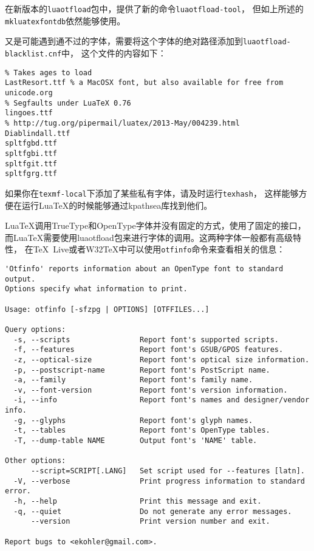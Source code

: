 \documentclass[DIV=13]{article}
\def\LuaTeX{Lua\TeX}
\def\XeTeX{\hologo{XeTeX}}
\begin{document}
在新版本的\texttt{luaotfload}包中，提供了新的命令\texttt{luaotfload-tool}，
但如上所述的\texttt{mkluatexfontdb}依然能够使用。

又是可能遇到通不过的字体，需要将这个字体的绝对路径添加到\texttt{luaotfload-blacklist.cnf}中，
这个文件的内容如下：
\begin{verbatim}
% Takes ages to load
LastResort.ttf % a MacOSX font, but also available for free from unicode.org 
% Segfaults under LuaTeX 0.76
lingoes.ttf
% http://tug.org/pipermail/luatex/2013-May/004239.html
Diablindall.ttf
spltfgbd.ttf
spltfgbi.ttf
spltfgit.ttf
spltfgrg.ttf
\end{verbatim}

如果你在\texttt{texmf-local}下添加了某些私有字体，请及时运行\texttt{texhash}，
这样能够方便在运行\LuaTeX 的时候能够通过kpathsea库找到他们。

Lua\TeX 调用TrueType和OpenType字体并没有固定的方式，\XeTeX 使用了固定的接口，
而Lua\TeX 需要使用luaotfload包来进行字体的调用。这两种字体一般都有高级特性，
在\TeX\ Live或者W32\TeX 中可以使用\texttt{otfinfo}命令来查看相关的信息：
\begin{verbatim}
'Otfinfo' reports information about an OpenType font to standard output.
Options specify what information to print.

Usage: otfinfo [-sfzpg | OPTIONS] [OTFFILES...]

Query options:
  -s, --scripts                Report font's supported scripts.
  -f, --features               Report font's GSUB/GPOS features.
  -z, --optical-size           Report font's optical size information.
  -p, --postscript-name        Report font's PostScript name.
  -a, --family                 Report font's family name.
  -v, --font-version           Report font's version information.
  -i, --info                   Report font's names and designer/vendor info.
  -g, --glyphs                 Report font's glyph names.
  -t, --tables                 Report font's OpenType tables.
  -T, --dump-table NAME        Output font's 'NAME' table.

Other options:
      --script=SCRIPT[.LANG]   Set script used for --features [latn].
  -V, --verbose                Print progress information to standard error.
  -h, --help                   Print this message and exit.
  -q, --quiet                  Do not generate any error messages.
      --version                Print version number and exit.

Report bugs to <ekohler@gmail.com>.
\end{verbatim}
\end{document}
